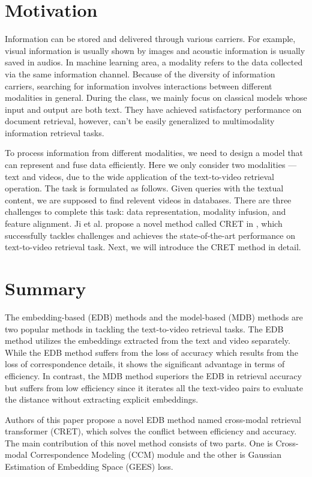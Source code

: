 \documentclass{article}
\begin{document}
\section{Motivation}
Information can be stored and delivered through various carriers. For example, visual information is usually shown by images and acoustic information is usually saved in audios. In machine learning area, a modality refers to the data collected via the same information channel. Because of the diversity of information carriers, searching for information involves interactions between different modalities in general. During the class, we mainly focus on classical models whose input and output are both text. They have achieved satisfactory performance on document retrieval, however, can't be easily generalized to multimodality information retrieval tasks.

To process information from different modalities, we need to design a model that can represent and fuse data efficiently. Here we only consider two modalities --- text and videos, due to the wide application of the text-to-video retrieval operation. The task is formulated as follows. Given queries with the textual content, we are supposed to find relevent videos in databases. There are three challenges to complete this task: data representation, modality infusion, and feature alignment. Ji et al. propose a novel method called CRET in \cite{cret}, which successfully tackles challenges and achieves the state-of-the-art performance on text-to-video retrieval task. Next, we will introduce the CRET method in detail.

\section{Summary}
The embedding-based (EDB) methods and the model-based (MDB) methods are two popular methods in tackling the text-to-video retrieval tasks. The EDB method utilizes the embeddings extracted from the text and video separately. While the EDB method suffers from the loss of accuracy which results from the loss of correspondence details, it shows the significant advantage in terms of efficiency. In contrast, the MDB method superiors the EDB in retrieval accuracy but suffers from low efficiency since it iterates all the text-video pairs to evaluate the distance without extracting explicit embeddings.

Authors of this paper propose a novel EDB method named cross-modal retrieval transformer (CRET), which solves the conflict between efficiency and accuracy. The main contribution of this novel method consists of two parts. One is Cross-modal Correspondence Modeling (CCM) module and the other is Gaussian Estimation of Embedding Space (GEES) loss. 
\end{document}

